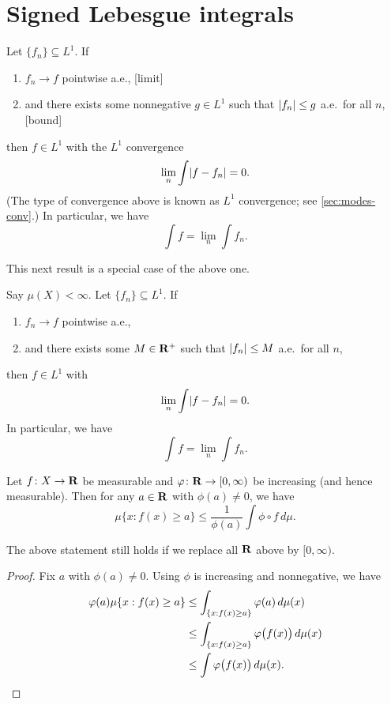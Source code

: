 \section{Signed Lebesgue integrals}
\begin{namedthm} \label{thm:DCT}
    Let $\{f_n\}\subseteq L^1$. If 
    \begin{enumerate}
        \item $f_n \to f$ pointwise a.e., [limit]
        \item and there exists some nonnegative $g \in L^1$ such that $\abs{f_n} \leq g$ a.e.\ for all $n$, [bound]
    \end{enumerate}
    then $f \in L^1$ with the $L^1$ convergence \[
        \lim_n \int \abs{f - f_n} = 0.
    \] (The type of convergence above is known as $L^1$ convergence; see \cref{sec:modes-conv}.) In particular, we have \[
        \int f = \lim_n \int f_n.
    \]
    
\end{namedthm}

This next result is a special case of the above one.
\begin{namedthm} \label{thm:bdd-conv-thm}
    Say $\mu(X) < \infty$. Let $\{f_n\} \subseteq L^1$. If \begin{enumerate}
        \item $f_n \to f$ pointwise a.e.,
        \item and there exists some $M \in \R^+$ such that $\abs{f_n} \leq M$ a.e.\ for all $n$, 
    \end{enumerate}
    then $f \in L^1$ with \[
        \lim_n \int \abs{f - f_n} = 0.
    \] In particular, we have \[
        \int f = \lim_n \int f_n.
    \]
\end{namedthm}

\begin{namedthm} \label{thm:Markov-ms}
    Let $f\colon X \to \R$ be measurable and $\phi\colon \R \to [0,\infty)$ be increasing (and hence measurable). Then for any $a\in \R$ with $\phi(a)\neq 0$, we have \[
        \mu\{x:f(x) \geq a\} \leq \frac{1}{\phi(a)}\int \phi\circ f\,d\mu.
    \]

    The above statement still holds if we replace all $\R$ above by $[0,\infty)$.
\end{namedthm}
\begin{proof}
    Fix $a$ with $\phi(a)\neq 0$. Using $\phi$ is increasing and nonnegative, we have \begin{align*}
        \phi(a)\mu\{x:f(x) \geq a\} & \leq \int_{\{x:f(x) \geq a\}} \phi(a)\,d\mu(x) \\
        & \leq \int_{\{x:f(x) \geq a\}} \phi\bigl(f(x)\bigr)\,d\mu(x) \\
        & \leq \int \phi\bigl(f(x)\bigr)\,d\mu(x). \qedhere
    \end{align*}
\end{proof}

